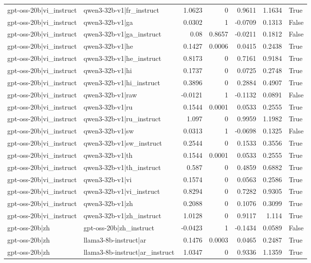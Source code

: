 \begin{table}
\begin{tabular}{l l r r r r l}
gpt-oss-20b|vi_instruct & qwen3-32b-v1|fr_instruct & 1.0623 & 0 & 0.9611 & 1.1634 & True \\
gpt-oss-20b|vi_instruct & qwen3-32b-v1|ga & 0.0302 & 1 & -0.0709 & 0.1313 & False \\
gpt-oss-20b|vi_instruct & qwen3-32b-v1|ga_instruct & 0.08 & 0.8657 & -0.0211 & 0.1812 & False \\
gpt-oss-20b|vi_instruct & qwen3-32b-v1|he & 0.1427 & 0.0006 & 0.0415 & 0.2438 & True \\
gpt-oss-20b|vi_instruct & qwen3-32b-v1|he_instruct & 0.8173 & 0 & 0.7161 & 0.9184 & True \\
gpt-oss-20b|vi_instruct & qwen3-32b-v1|hi & 0.1737 & 0 & 0.0725 & 0.2748 & True \\
gpt-oss-20b|vi_instruct & qwen3-32b-v1|hi_instruct & 0.3896 & 0 & 0.2884 & 0.4907 & True \\
gpt-oss-20b|vi_instruct & qwen3-32b-v1|raw & -0.0121 & 1 & -0.1132 & 0.0891 & False \\
gpt-oss-20b|vi_instruct & qwen3-32b-v1|ru & 0.1544 & 0.0001 & 0.0533 & 0.2555 & True \\
gpt-oss-20b|vi_instruct & qwen3-32b-v1|ru_instruct & 1.097 & 0 & 0.9959 & 1.1982 & True \\
gpt-oss-20b|vi_instruct & qwen3-32b-v1|sw & 0.0313 & 1 & -0.0698 & 0.1325 & False \\
gpt-oss-20b|vi_instruct & qwen3-32b-v1|sw_instruct & 0.2544 & 0 & 0.1533 & 0.3556 & True \\
gpt-oss-20b|vi_instruct & qwen3-32b-v1|th & 0.1544 & 0.0001 & 0.0533 & 0.2555 & True \\
gpt-oss-20b|vi_instruct & qwen3-32b-v1|th_instruct & 0.587 & 0 & 0.4859 & 0.6882 & True \\
gpt-oss-20b|vi_instruct & qwen3-32b-v1|vi & 0.1574 & 0 & 0.0563 & 0.2586 & True \\
gpt-oss-20b|vi_instruct & qwen3-32b-v1|vi_instruct & 0.8294 & 0 & 0.7282 & 0.9305 & True \\
gpt-oss-20b|vi_instruct & qwen3-32b-v1|zh & 0.2088 & 0 & 0.1076 & 0.3099 & True \\
gpt-oss-20b|vi_instruct & qwen3-32b-v1|zh_instruct & 1.0128 & 0 & 0.9117 & 1.114 & True \\
gpt-oss-20b|zh & gpt-oss-20b|zh_instruct & -0.0423 & 1 & -0.1434 & 0.0589 & False \\
gpt-oss-20b|zh & llama3-8b-instruct|ar & 0.1476 & 0.0003 & 0.0465 & 0.2487 & True \\
gpt-oss-20b|zh & llama3-8b-instruct|ar_instruct & 1.0347 & 0 & 0.9336 & 1.1359 & True \\

\end{tabular}
\end{table}
